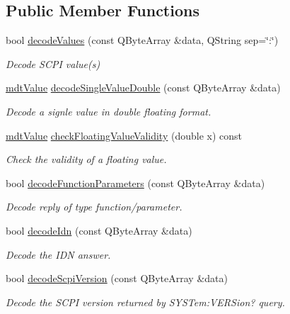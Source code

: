 \subsection*{Public Member Functions}
\begin{DoxyCompactItemize}
\item 
bool \hyperlink{classmdt_frame_codec_scpi_a37a1703b6daee6f6bf91c6afb46191b3}{decodeValues} (const QByteArray \&data, QString sep=\char`\"{}:\char`\"{})
\begin{DoxyCompactList}\small\item\em Decode SCPI value(s) \end{DoxyCompactList}\item 
\hyperlink{classmdt_value}{mdtValue} \hyperlink{classmdt_frame_codec_scpi_ad2d7b41d0b3413074d770c5f512bee12}{decodeSingleValueDouble} (const QByteArray \&data)
\begin{DoxyCompactList}\small\item\em Decode a signle value in double floating format. \end{DoxyCompactList}\item 
\hyperlink{classmdt_value}{mdtValue} \hyperlink{classmdt_frame_codec_scpi_a90d550cfe0ed5605c63a064359fc762d}{checkFloatingValueValidity} (double x) const 
\begin{DoxyCompactList}\small\item\em Check the validity of a floating value. \end{DoxyCompactList}\item 
bool \hyperlink{classmdt_frame_codec_scpi_ac928eac971706f5c78f36d0ae4dc0c42}{decodeFunctionParameters} (const QByteArray \&data)
\begin{DoxyCompactList}\small\item\em Decode reply of type function/parameter. \end{DoxyCompactList}\item 
bool \hyperlink{classmdt_frame_codec_scpi_a6ddd1b8e23252dc7f03c279a030cb36f}{decodeIdn} (const QByteArray \&data)
\begin{DoxyCompactList}\small\item\em Decode the IDN answer. \end{DoxyCompactList}\item 
bool \hyperlink{classmdt_frame_codec_scpi_a3ae1183cbe26272a7a025e89fc961042}{decodeScpiVersion} (const QByteArray \&data)
\begin{DoxyCompactList}\small\item\em Decode the SCPI version returned by SYSTem:VERSion? query. \end{DoxyCompactList}\item 

\end{DoxyCompactItemize}
